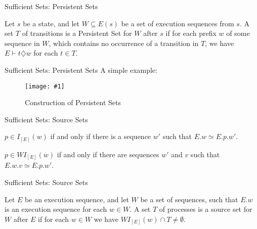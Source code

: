\documentclass[9pt]{beamer}
\newcommand{\trace}[2]{
\begin{figure}[H]
\centering
\texttt{[image: \#1]}
\caption{#2}
\label{#2}
\end{figure}
}
\begin{document}
\begin{frame}{Sufficient Sets: Persistent Sets}
    
\begin{definition}
Let $s$ be a state, and let $W \subseteq E(s)$ be a set
of execution sequences from $s$. A set $T$ of transitions is a Persistent Set for $W$
after $s$ if for each prefix $w$ of some sequence in $W$, which contains no occurrence
of a transition in $T$,  we have $E \vdash t \diamondsuit w$ for each $t \in T$.
\end{definition}
\end{frame}

\begin{frame}{Sufficient Sets: Persistent Sets}
A simple example:
    
\trace{../img/persistent.pdf}{Construction of Persistent Sets}
    
\end{frame}

\begin{frame}{Sufficient Sets: Source Sets}

\begin{definition}
    $p \in I_{[E]}(w)$ if and only if there is a sequence $w'$ such that $E.w \simeq E.p.w'$.
\end{definition}


\begin{definition}

$p \in WI_{[E]}(w)$ if and only if there are sequences $w'$ and $v$ such
that $E.w.v \simeq E.p.w'$.

\end{definition}
    
\end{frame}


\begin{frame}{Sufficient Sets: Source Sets}

\begin{definition}
Let $E$ be an execution sequence,
and let $W$ be a set of sequences, such that $E.w$ is an execution
sequence for each $w \in W$. A set $T$ of processes is a source set for
$W$ after $E$ if for each $w \in W$ we have $WI_{[E]}(w) \cap T  \neq \emptyset$.
\end{definition}

\end{frame}
\end{document}
